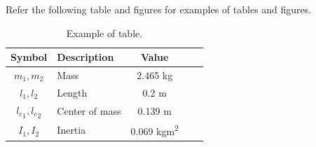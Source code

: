 \documentclass[conference]{IEEEtran}
\begin{document}
Refer the following table and figures for examples of tables and figures.

\begin{table}[t]
    \renewcommand{\arraystretch}{1.3}
    \caption{Example of table.}
    \centering
    \begin{tabular}{c m{9.5em} c c c }
    \hline
    \textbf{Symbol} & \textbf{Description} & \textbf{Value} \\
    \hline
    \hline 
    $m_1,m_2$ & Mass & 2.465 kg \\
    \hline
    $l_1,l_2$  & Length & 0.2 m \\  
    \hline
    ${l_c}_1,{l_c}_2$ & Center of mass & 0.139 m \\
    \hline
    $I_1,I_2$  & Inertia & 0.069 kgm\textsuperscript{2} \\
    \hline
    \end{tabular}
    \label{table:example}
\end{table}
\end{document}
